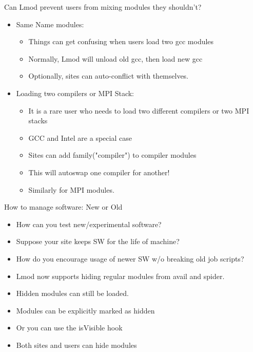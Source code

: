 \documentclass{beamer}
\begin{document}
\begin{frame}{Can Lmod prevent users from mixing modules they shouldn't?}
  \begin{itemize}
      \item Same Name modules:
      \begin{itemize}
        \item Things can get confusing when users load two gcc modules
        \item Normally, Lmod will unload old gcc, then load new gcc
        \item Optionally, sites can auto-conflict with themselves.
      \end{itemize}
    \item Loading two compilers or MPI Stack:
      \begin{itemize}
        \item It is a rare user who needs to load two different
          compilers or two MPI stacks
        \item GCC and Intel are a special case
        \item Sites can add family("compiler") to compiler modules
        \item This will autoswap one compiler for another!
        \item Similarly for MPI modules.
      \end{itemize}
  \end{itemize}
\end{frame}

\begin{frame}{How to manage software: New or Old}
  \begin{itemize}
    \item How can you test new/experimental software?
    \item Suppose your site keeps SW for the life of machine?
    \item How do you encourage usage of newer SW w/o breaking old job
      scripts?
    \item Lmod now supports hiding regular modules from avail and
      spider.
    \item Hidden modules can still be loaded.
    \item Modules can be explicitly marked as hidden
    \item Or you can use the isVisible hook
    \item Both sites and users can hide modules
  \end{itemize}
\end{frame}
\end{document}
